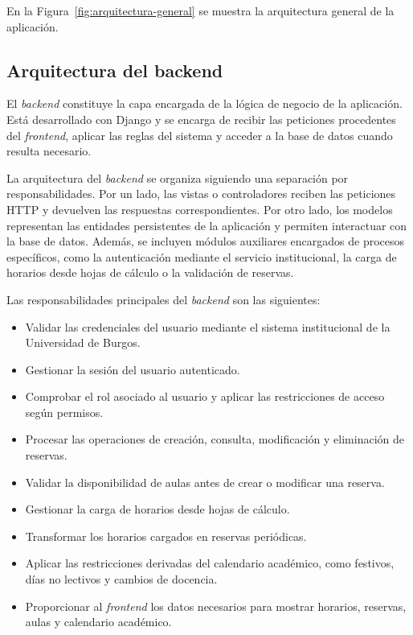En la Figura~\ref{fig:arquitectura-general} se muestra la arquitectura general de la aplicación.


\subsection{Arquitectura del backend}

El \textit{backend} constituye la capa encargada de la lógica de negocio de la aplicación. Está desarrollado con Django y se encarga de recibir las peticiones procedentes del \textit{frontend}, aplicar las reglas del sistema y acceder a la base de datos cuando resulta necesario.

La arquitectura del \textit{backend} se organiza siguiendo una separación por responsabilidades. Por un lado, las vistas o controladores reciben las peticiones HTTP y devuelven las respuestas correspondientes. Por otro lado, los modelos representan las entidades persistentes de la aplicación y permiten interactuar con la base de datos. Además, se incluyen módulos auxiliares encargados de procesos específicos, como la autenticación mediante el servicio institucional, la carga de horarios desde hojas de cálculo o la validación de reservas.

Las responsabilidades principales del \textit{backend} son las siguientes:

\begin{itemize}
	\item Validar las credenciales del usuario mediante el sistema institucional de la Universidad de Burgos.
	\item Gestionar la sesión del usuario autenticado.
	\item Comprobar el rol asociado al usuario y aplicar las restricciones de acceso según permisos.
	\item Procesar las operaciones de creación, consulta, modificación y eliminación de reservas.
	\item Validar la disponibilidad de aulas antes de crear o modificar una reserva.
	\item Gestionar la carga de horarios desde hojas de cálculo.
	\item Transformar los horarios cargados en reservas periódicas.
	\item Aplicar las restricciones derivadas del calendario académico, como festivos, días no lectivos y cambios de docencia.
	\item Proporcionar al \textit{frontend} los datos necesarios para mostrar horarios, reservas, aulas y calendario académico.
\end{itemize}

